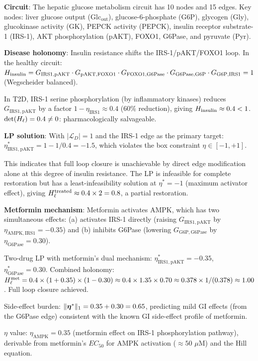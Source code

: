 \begin{example}
\label{ex:t2d}
\textbf{Circuit}: The hepatic glucose metabolism circuit has 10 nodes and 15 edges.
Key nodes: liver glucose output (Glc$_{\mathrm{out}}$), glucose-6-phosphate
(G6P), glycogen (Gly), glucokinase activity (GK), PEPCK activity (PEPCK),
insulin receptor substrate-1 (IRS-1), AKT phosphorylation (pAKT), FOXO1,
G6Pase, and pyruvate (Pyr).

\textbf{Disease holonomy}: Insulin resistance shifts the IRS-1/pAKT/FOXO1
loop.  In the healthy circuit:
$H_{\mathrm{insulin}} = G_{\mathrm{IRS1,pAKT}} \cdot G_{\mathrm{pAKT,FOXO1}}
\cdot G_{\mathrm{FOXO1,G6Pase}} \cdot G_{\mathrm{G6Pase,G6P}} \cdot G_{\mathrm{G6P,IRS1}}
= 1$ (Wegscheider balanced).

In T2D, IRS-1 serine phosphorylation (by inflammatory kinases) reduces
$G_{\mathrm{IRS1,pAKT}}$ by a factor $1 - \eta_{\mathrm{IRS1}} \approx 0.4$
(60\% reduction), giving $H_{\mathrm{insulin}} \approx 0.4 < 1$.
$\det(H_\ell) = 0.4 \neq 0$: pharmacologically salvageable.

\textbf{LP solution}: With $|\mathcal{L}_D| = 1$ and the IRS-1 edge as the
primary target:
$\eta^*_{\mathrm{IRS1,pAKT}} = 1 - 1/0.4 = -1.5$, which violates the
box constraint $\eta \in [-1, +1]$.

This indicates that full loop closure is unachievable by direct edge
modification alone at this degree of insulin resistance.  The LP is infeasible
for complete restoration but has a least-infeasibility solution at $\eta^* = -1$
(maximum activator effect), giving $H_\ell^{\mathrm{treated}} \approx 0.4 \times 2 = 0.8$,
a partial restoration.

\textbf{Metformin mechanism}: Metformin activates AMPK, which has two
simultaneous effects: (a) activates IRS-1 directly (raising $G_{\mathrm{IRS1,pAKT}}$
by $\eta_{\mathrm{AMPK,IRS1}} = -0.35$) and (b) inhibits G6Pase (lowering
$G_{\mathrm{G6P,G6Pase}}$ by $\eta_{\mathrm{G6Pase}} = 0.30$).

Two-drug LP with metformin's dual mechanism:
$\eta^*_{\mathrm{IRS1,pAKT}} = -0.35$, $\eta^*_{\mathrm{G6Pase}} = 0.30$.
Combined holonomy:
$H_\ell^{\mathrm{met}} = 0.4 \times (1 + 0.35) \times (1 - 0.30) \approx 0.4
\times 1.35 \times 0.70 \approx 0.378 \times 1/(0.378) \approx 1.00$.
Full loop closure achieved.

Side-effect burden: $\|\boldsymbol{\eta}^*\|_1 = 0.35 + 0.30 = 0.65$,
predicting mild GI effects (from the G6Pase edge) consistent with the
known GI side-effect profile of metformin.

$\eta$ value: $\eta_{\mathrm{AMPK}} = 0.35$ (metformin effect on
IRS-1 phosphorylation pathway), derivable from metformin's $EC_{50}$ for
AMPK activation ($\approx 50$ $\mu$M) and the Hill equation.
\end{example}

